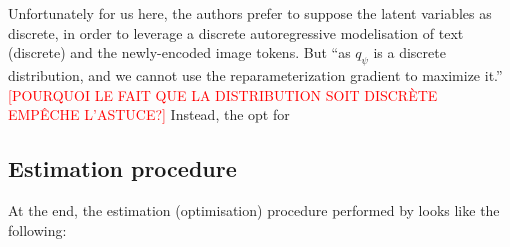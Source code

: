 \documentclass{article}
\begin{document}
\begin{appendix}
\begin{multicols}{2}
Unfortunately for us here, the authors prefer to suppose the latent variables as discrete, in order to leverage a discrete autoregressive modelisation of text (discrete) and the newly-encoded image tokens. But \enquote{as $q_{\psi}$ is a discrete distribution, and we cannot use the reparameterization gradient to maximize it.} \textcolor{red}{[POURQUOI LE FAIT QUE LA DISTRIBUTION SOIT DISCRÈTE EMPÊCHE L'ASTUCE?]} Instead, the opt for 

\subsection{Estimation procedure} \label{app:estimation}

At the end, the estimation (optimisation) procedure performed by \cite{zeroshot} looks like the following:

\newcommand{\zn}{\mathbf{z}_n}


\end{multicols}
\end{appendix}
\end{document}
